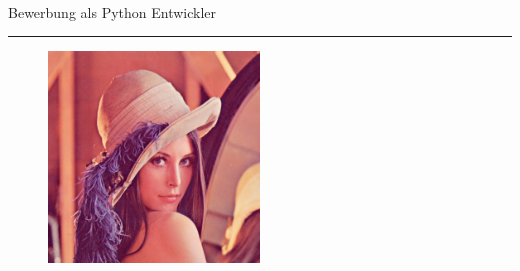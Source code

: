\documentclass[a4paper]{article}%
\begin{document}
%
\normalsize%
\
        \setmainfont[
            Path = fonts/,
            Extension = .otf,
            UprightFont = *
        ]{Fontin}
\vspace*{10mm}%
\begin{center}%
\begin{Huge}%
Bewerbung als Python Entwickler%
\end{Huge}%
\end{center}%
\noindent\rule{\textwidth}{1pt}%
\newline%
\vspace*{70mm}%


\begin{figure}[!ht]%
\centering%
\includegraphics[width=0.5\textwidth]{passphoto.png}%
\end{figure}
\end{document}
